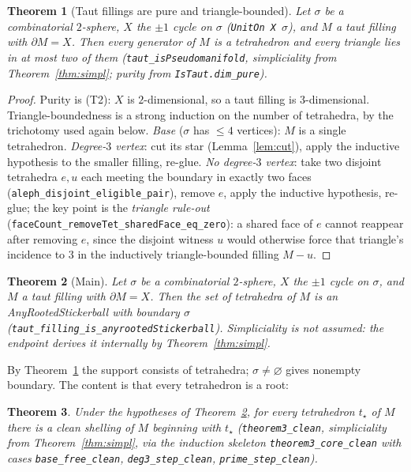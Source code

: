 \documentclass[11pt]{article}
\theoremstyle{plain}
\newtheorem{theorem}{Theorem}[section]
\theoremstyle{definition}
\theoremstyle{remark}
\newcommand{\bd}{\partial}
\newcommand{\code}[1]{\texttt{#1}}
\begin{document}
\begin{theorem}[Taut fillings are pure and triangle-bounded]\label{thm:pm}
Let $\sigma$ be a combinatorial $2$-sphere, $X$ the $\pm1$ cycle on $\sigma$
(\code{UnitOn X $\sigma$}), and $M$ a taut filling with $\bd M=X$. Then every
generator of $M$ is a tetrahedron and every triangle lies in at most two of them
(\code{taut\_isPseudomanifold}, simpliciality from Theorem~\ref{thm:simpl}; purity from
\code{IsTaut.dim\_pure}).
\end{theorem}

\begin{proof}
Purity is (T2): $X$ is $2$-dimensional, so a taut filling is $3$-dimensional.
Triangle-boundedness is a strong induction on the number of tetrahedra, by the trichotomy
used again below. \emph{Base} ($\sigma$ has $\le 4$ vertices): $M$ is a single tetrahedron.
\emph{Degree-$3$ vertex}: cut its star (Lemma~\ref{lem:cut}), apply the inductive
hypothesis to the smaller filling, re-glue. \emph{No degree-$3$ vertex}: take two disjoint
tetrahedra $e,u$ each meeting the boundary in exactly two faces
(\code{aleph\_disjoint\_eligible\_pair}), remove $e$, apply the inductive hypothesis, re-glue;
the key point is the \emph{triangle rule-out} (\code{faceCount\_removeTet\_sharedFace\_eq\_zero}):
a shared face of $e$ cannot reappear after removing $e$, since the disjoint witness $u$ would
otherwise force that triangle's incidence to $3$ in the inductively triangle-bounded filling
$M-u$.
\end{proof}

\begin{theorem}[Main]\label{thm:anyrooted}
Let $\sigma$ be a combinatorial $2$-sphere, $X$ the $\pm1$ cycle on $\sigma$, and $M$ a taut
filling with $\bd M=X$. Then the set of tetrahedra of $M$ is an
\emph{AnyRootedStickerball} with boundary $\sigma$
(\code{taut\_filling\_is\_anyrootedStickerball}). \emph{Simpliciality is not assumed}: the
endpoint derives it internally by Theorem~\ref{thm:simpl}.
\end{theorem}

By Theorem~\ref{thm:pm} the support consists of tetrahedra; $\sigma\neq\varnothing$ gives
nonempty boundary. The content is that every tetrahedron is a root:

\begin{theorem}\label{thm:freely}
Under the hypotheses of Theorem~\ref{thm:anyrooted}, for every tetrahedron $t_\star$ of $M$
there is a clean shelling of $M$ beginning with $t_\star$ (\code{theorem3\_clean}, simpliciality
from Theorem~\ref{thm:simpl}, via the induction skeleton \code{theorem3\_core\_clean} with cases
\code{base\_free\_clean}, \code{deg3\_step\_clean}, \code{prime\_step\_clean}).
\end{theorem}
\end{document}
